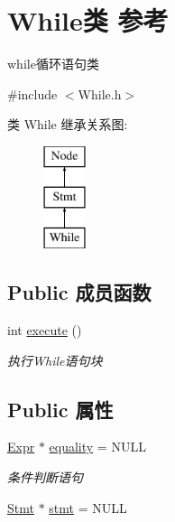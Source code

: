 \hypertarget{class_while}{}\section{While类 参考}
\label{class_while}


while循环语句类  




{\ttfamily \#include $<$While.\+h$>$}

类 While 继承关系图\+:\begin{figure}[H]
\begin{center}
\leavevmode
\includegraphics[height=3.000000cm]{class_while}
\end{center}
\end{figure}
\subsection*{Public 成员函数}
\begin{DoxyCompactItemize}
\item 
\mbox{\label{class_while_a23b58565983130bb54577f4399ffd822}} 
int \hyperlink{class_while_a23b58565983130bb54577f4399ffd822}{execute} ()
\begin{DoxyCompactList}\small\item\em 执行\+While语句块 \end{DoxyCompactList}\end{DoxyCompactItemize}
\subsection*{Public 属性}
\begin{DoxyCompactItemize}
\item 
\mbox{\label{class_while_a14af77714254099c0cc465944ef67dd3}} 
\hyperlink{class_expr}{Expr} $\ast$ \hyperlink{class_while_a14af77714254099c0cc465944ef67dd3}{equality} = N\+U\+LL
\begin{DoxyCompactList}\small\item\em 条件判断语句 \end{DoxyCompactList}\item 
\hyperlink{class_stmt}{Stmt} $\ast$ \hyperlink{class_while_a97dfbf50f27b969c5b765ecfb1ef4ac2}{stmt} = N\+U\+LL
\end{DoxyCompactItemize}

